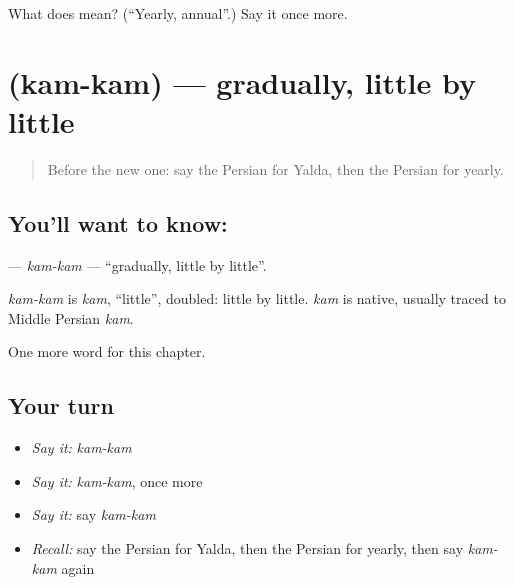 \begin{tcolorbox}[breakable,colback=teal!4,colframe=teal!35!black,title={Before you move on}]
What does  mean? (\textquotedblleft{}Yearly, annual\textquotedblright{}.) Say it once more.
\end{tcolorbox}
\section[\texorpdfstring{\fa{کم} \fa{کم} (kam-kam)}{کم کم (kam-kam)}]{  (kam-kam) — gradually, little by little}

\label{lesson:FA-C192-kam-kam}



\begin{quote}
Before the new one: say the Persian for Yalda, then the Persian for yearly.
\end{quote}

\subsection*{You'll want to know:  }
\textbf{ } — \emph{kam-kam} — \textquotedblleft{}gradually, little by little\textquotedblright{}.

\begin{cousinweb}
\emph{kam-kam} is \emph{kam}, \textquotedblleft{}little\textquotedblright{}, doubled: little by little. \emph{kam} is native, usually traced to Middle Persian \emph{kam}.
\end{cousinweb}

\begin{grammarlens}[title={What you've built}]
One more word for this chapter.
\end{grammarlens}

\subsection*{Your turn}
\begin{itemize}
\raggedright
  \item \emph{Say it:} \emph{kam-kam}
  \item \emph{Say it:} \emph{kam-kam}, once more
  \item \emph{Say it:} say \emph{kam-kam}
  \item \emph{Recall:} say the Persian for Yalda, then the Persian for yearly, then say \emph{kam-kam} again
\end{itemize}

